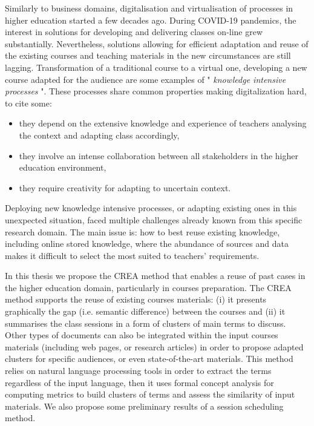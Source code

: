 \begin{footnotesize}


Similarly to business domains, digitalisation and virtualisation of processes in higher education started a few decades ago.
During COVID-19 pandemics, the interest in solutions for developing and delivering classes on-line grew substantially.
Nevertheless, solutions allowing for efficient adaptation and reuse of the existing courses and teaching materials in the new circumstances are still lagging.
Transformation of a traditional course to a virtual one, developing a new course adapted for the audience are some examples of  " \textit{knowledge intensive processes} ".
These processes share common properties making digitalization hard, to cite some:
\begin{itemize}
\item they depend on the extensive knowledge and experience of teachers analysing the context and adapting class accordingly,
\item they involve an intense collaboration between all stakeholders in the higher education environment,
\item they require creativity for adapting to uncertain context.
\end{itemize}
Deploying new knowledge intensive processes, or adapting existing ones in this unexpected situation, faced multiple challenges already known from this specific research domain.
The main issue is: how to best reuse existing knowledge, including online stored knowledge, where the abundance of sources and data makes it difficult to select the most suited to teachers' requirements.

In this thesis we propose the CREA method that enables a reuse of past cases in the higher education domain, particularly in courses preparation.
The CREA method supports the reuse of existing courses materials: (i) it presents graphically the gap (i.e. semantic difference) between the courses and (ii) it summarises the class sessions in a form of clusters of main terms to discuss.
Other types of documents can also be integrated within the input courses materials (including web pages, or research articles) in order to propose adapted clusters for specific audiences, or even state-of-the-art materials.
This method relies on natural language processing tools in order to extract the terms regardless of the input language, then it uses formal concept analysis for computing metrics to build clusters of terms and assess the similarity of input materials.
We also propose some preliminary results of a session scheduling method.




\end{footnotesize}
